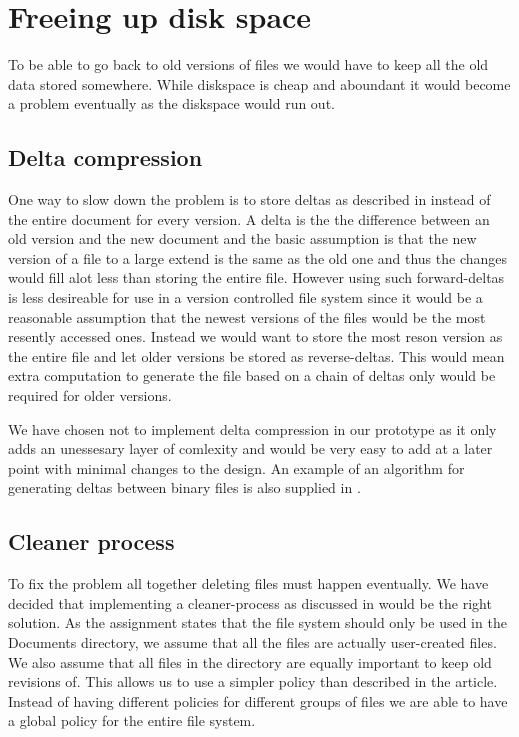 \documentclass[12pt]{article}
\begin{document}
\section{Freeing up disk space}

To be able to go back to old versions of files we would have to keep
all the old data stored somewhere. While diskspace is cheap and aboundant it would become a problem eventually as the diskspace would run out.

\subsection{Delta compression}
One way to slow down the problem is to store deltas as described in \cite{MacDonald:kx} instead of the entire document for every version. A delta is the the difference between an old version and the new document and the basic assumption is that the new version of a file to a large extend is the same as the old one and thus the changes would fill alot less than storing the entire file. However using such forward-deltas is less desireable for use in a version controlled file system since it would be a reasonable assumption that the newest versions of the files would be the most resently accessed ones. Instead we would want to store the most reson version as the entire file and let older versions be stored as reverse-deltas. This would mean extra computation to generate the file based on a chain of deltas only would be required for older versions.

We have chosen not to implement delta compression in our prototype as it only adds an unessesary layer of comlexity and would be very easy to add at a later point with minimal changes to the design. An example of an algorithm for generating deltas between binary files is also supplied in \cite{MacDonald:kx}.

\subsection{Cleaner process}
To fix the problem all together deleting files must happen eventually.
We have decided that implementing a cleaner-process as discussed in
\cite{319159} would be the right solution. As the assignment states that
the file system should only be used in the Documents directory, we
assume that all the files are actually user-created files. We also
assume that all files in the directory are equally important to keep
old revisions of. This allows us to use a simpler policy than
described in the article. Instead of having different policies for
different groups of files we are able to have a global policy for the
entire file system.
\end{document}
